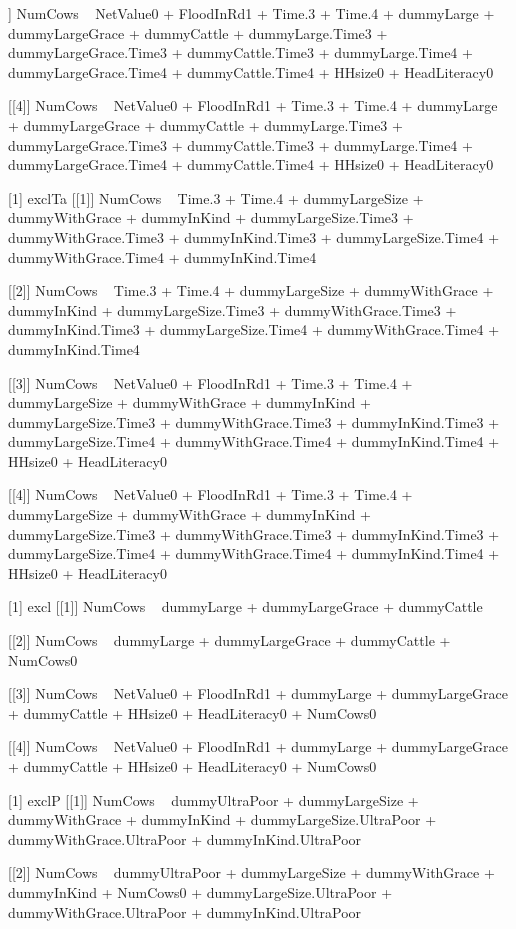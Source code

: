 \begin{Schunk}
\begin{Soutput}
[[3]]
NumCows ~ NetValue0 + FloodInRd1 + Time.3 + Time.4 + dummyLarge + 
    dummyLargeGrace + dummyCattle + dummyLarge.Time3 + dummyLargeGrace.Time3 + 
    dummyCattle.Time3 + dummyLarge.Time4 + dummyLargeGrace.Time4 + 
    dummyCattle.Time4 + HHsize0 + HeadLiteracy0

[[4]]
NumCows ~ NetValue0 + FloodInRd1 + Time.3 + Time.4 + dummyLarge + 
    dummyLargeGrace + dummyCattle + dummyLarge.Time3 + dummyLargeGrace.Time3 + 
    dummyCattle.Time3 + dummyLarge.Time4 + dummyLargeGrace.Time4 + 
    dummyCattle.Time4 + HHsize0 + HeadLiteracy0

[1] exclTa
[[1]]
NumCows ~ Time.3 + Time.4 + dummyLargeSize + dummyWithGrace + 
    dummyInKind + dummyLargeSize.Time3 + dummyWithGrace.Time3 + 
    dummyInKind.Time3 + dummyLargeSize.Time4 + dummyWithGrace.Time4 + 
    dummyInKind.Time4

[[2]]
NumCows ~ Time.3 + Time.4 + dummyLargeSize + dummyWithGrace + 
    dummyInKind + dummyLargeSize.Time3 + dummyWithGrace.Time3 + 
    dummyInKind.Time3 + dummyLargeSize.Time4 + dummyWithGrace.Time4 + 
    dummyInKind.Time4

[[3]]
NumCows ~ NetValue0 + FloodInRd1 + Time.3 + Time.4 + dummyLargeSize + 
    dummyWithGrace + dummyInKind + dummyLargeSize.Time3 + dummyWithGrace.Time3 + 
    dummyInKind.Time3 + dummyLargeSize.Time4 + dummyWithGrace.Time4 + 
    dummyInKind.Time4 + HHsize0 + HeadLiteracy0

[[4]]
NumCows ~ NetValue0 + FloodInRd1 + Time.3 + Time.4 + dummyLargeSize + 
    dummyWithGrace + dummyInKind + dummyLargeSize.Time3 + dummyWithGrace.Time3 + 
    dummyInKind.Time3 + dummyLargeSize.Time4 + dummyWithGrace.Time4 + 
    dummyInKind.Time4 + HHsize0 + HeadLiteracy0

[1] excl
[[1]]
NumCows ~ dummyLarge + dummyLargeGrace + dummyCattle

[[2]]
NumCows ~ dummyLarge + dummyLargeGrace + dummyCattle + NumCows0

[[3]]
NumCows ~ NetValue0 + FloodInRd1 + dummyLarge + dummyLargeGrace + 
    dummyCattle + HHsize0 + HeadLiteracy0 + NumCows0

[[4]]
NumCows ~ NetValue0 + FloodInRd1 + dummyLarge + dummyLargeGrace + 
    dummyCattle + HHsize0 + HeadLiteracy0 + NumCows0

[1] exclP
[[1]]
NumCows ~ dummyUltraPoor + dummyLargeSize + dummyWithGrace + 
    dummyInKind + dummyLargeSize.UltraPoor + dummyWithGrace.UltraPoor + 
    dummyInKind.UltraPoor

[[2]]
NumCows ~ dummyUltraPoor + dummyLargeSize + dummyWithGrace + 
    dummyInKind + NumCows0 + dummyLargeSize.UltraPoor + dummyWithGrace.UltraPoor + 
    dummyInKind.UltraPoor


\end{Soutput}
\end{Schunk}
